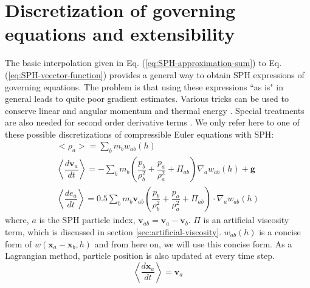 \section{Discretization of governing equations and extensibility}
The basic interpolation given in Eq. (\ref{eq:SPH-approximation-sum}) to Eq. (\ref{eq:SPH-vecctor-function}) provides a general way to obtain SPH expressions of governing equations. The problem is that using these expressions ``{as is}" in general leads to quite poor gradient estimates. Various tricks can be used to conserve linear and angular momentum and thermal energy \citep{monaghan1992smoothed}. Special treatments are also needed for second order derivative terms \citep{monaghan2005smoothed}. We only refer here to one of these possible discretizations of compressible Euler equations with SPH:
\begin{align}
<\rho_a> = \sum_b m_b w_{ab} \left(h\right) \label{eq:ns-sph-d} \\
\left\langle\dfrac{d \textbf{v}_a}{d t}\right\rangle = -\sum_b m_b \left(\dfrac{p_b}{\rho_b^2} + \dfrac{p_a}{\rho_a^2} + \Pi_{ab}\right) \nabla_a w_{a b}\left(h\right) +\textbf{g} \label{eq:ns-sph-v} \\
\left\langle\dfrac{d e_a}{d t}\right\rangle=
 0.5\sum_b m_b \textbf{v}_{a b}\left(\dfrac{p_b}{\rho_b^2} + \dfrac{p_a}{\rho_a^2} + \Pi_{ab}\right) \cdot \nabla_a w_{a b}\left(h\right) \label{eq:ns-sph-e}
\end{align}
where, $a$ is the SPH particle index, $\textbf{v}_{a b} = \textbf{v}_a - \textbf{v}_b$. $\Pi$ is an artificial viscosity term, which is discussed in section \ref{sec:artificial-viscosity}. $w_{a b}\left(h\right)$ is a concise form of $w\left(\textbf{x}_a - \textbf{x}_b, h\right)$ and from here on, we will use this concise form.
As a Lagrangian method, particle position is also updated at every time step.
\begin{equation}
\left\langle\dfrac{d \textbf{x}_a}{dt}\right\rangle = \textbf{v}_a \label{eq:SPH-update-pos}
\end{equation}

